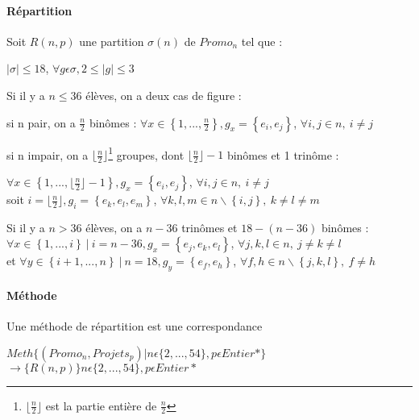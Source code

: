 \documentclass[10pt,a4paper]{scrartcl}
\begin{document}
\paragraph{Répartition}Soit $R(n,p)$ une partition $\sigma(n)$ de $Promo_{n}$ tel que : \\
\begin{center}
	$|\sigma|\leq18$, $\forall g\epsilon\sigma , 2\leq |g| \leq3$
\end{center}
Si il y a $n \leqslant 36$ élèves, on a deux cas de figure : \\
\begin{itemize}
	\begin{item}
		si n pair, on a $\frac{n}{2}$ binômes :  $\forall x \in \left\{ 1, ..., \frac{n}{2} \right\}, g_{x} = \left\{ e_{i}, e_{j} \right\}$, $\forall i, j \in n,\ i \neq j$
	\end{item}
	\begin{item}
		si n impair, on a  $\lfloor \frac{n}{2} \rfloor$\footnote{$\lfloor \frac{n}{2} \rfloor$ est la partie entière de $\frac{n}{2}$} groupes, dont $\lfloor \frac{n}{2} \rfloor-1$ binômes et 1 trinôme :
		
		$\forall x \in \left\{ 1, ..., \lfloor \frac{n}{2} \rfloor -1 \right\}, g_{x} = \left\{ e_{i}, e_{j} \right\}$, $\forall i, j \in n,\ i \neq j$ \\
		soit $i=\lfloor \frac{n}{2} \rfloor, g_{i} = \left\{ e_{k}, e_{l}, e_{m} \right\}$, $\forall k, l, m \in n\backslash\left\{ i, j \right\},\ k \neq l \neq m$ \newline
	\end{item}
\end{itemize}

Si il y a $n > 36$ élèves, on a $n-36$ trinômes et $18-(n-36)$ binômes : \\
$\forall x \in \left\{ 1, ..., i \right\} \ | \ i=n-36, g_{x} = \left\{ e_{j}, e_{k}, e_{l} \right\}$, $\forall j, k, l \in n,\ j \neq k \neq l$ \\
et $\forall y \in \left\{ i+1, ..., n \right\} \ | \ n=18, g_{y} = \left\{ e_{f}, e_{h} \right\}$, $\forall f, h \in n\backslash\left\{ j, k, l \right\},\ f \neq h$

\paragraph{Méthode} Une méthode de répartition est une correspondance 
\begin{center}
	$Meth\lbrace(Promo_{n}, Projets_{p}) | n\epsilon \lbrace2,...,54\rbrace, p\epsilon Entier* \rbrace$
	$\rightarrow\lbrace R(n,p)\rbrace  n\epsilon \lbrace2,...,54\rbrace, p\epsilon Entier*$
\end{center}
\end{document}
